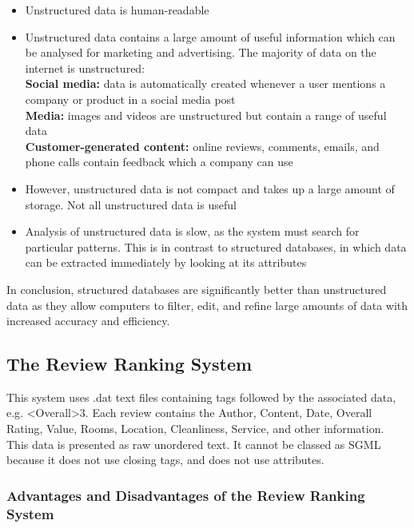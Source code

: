 \documentclass[12pt]{article}
\begin{document}
\begin{itemize}
\item 
Unstructured data is human-readable
\item 
Unstructured data contains a large amount of useful information which can be analysed for marketing and advertising. The majority of data on the internet is unstructured: \\
\textbf{Social media:} data is automatically created whenever a user mentions a company or product in a social media post \\
\textbf{Media:} images and videos are unstructured but contain a range of useful data \\
\textbf{Customer-generated content:} online reviews, comments, emails, and phone calls contain feedback which a company can use 
\item 
However, unstructured data is not compact and takes up a large amount of storage. Not all unstructured data is useful
\item 
Analysis of unstructured data is slow, as the system must search for particular patterns. This is in contrast to structured databases, in which data can be extracted immediately by looking at its attributes
\end{itemize}

In conclusion, structured databases are significantly better than unstructured data as they allow computers to filter, edit, and refine large amounts of data with increased accuracy and efficiency.

\newpage
\subsection{The Review Ranking System}

This system uses .dat text files containing tags followed by the associated data, e.g. \textless Overall\textgreater 3. Each review contains the Author, Content, Date, Overall Rating, Value, Rooms, Location, Cleanliness, Service, and other information. \\

This data is presented as raw unordered text. It cannot be classed as SGML because it does not use closing tags, and does not use attributes. 

\subsubsection{Advantages and Disadvantages of the Review Ranking System}
\end{document}
